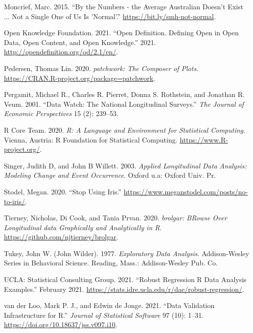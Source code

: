 \documentclass{article}
\newlength{\cslhangindent}
\newlength{\cslentryspacingunit} %
\newenvironment{CSLReferences}[2] %
 {%
  \setlength{\parindent}{0pt}
  \ifodd #1
  \let\oldpar\par
  \def\par{\hangindent=\cslhangindent\oldpar}
  \fi
  \setlength{\parskip}{#2\cslentryspacingunit}
 }%
 {}
\begin{document}
\begin{CSLReferences}{1}{0}
\leavevmode{}%
Moncrief, Marc. 2015. {``By the Numbers - the Average Australian Doesn't Exist ... Not a Single One of Us Is 'Normal'.''} \url{https://bit.ly/smh-not-normal}.

\leavevmode{}%
Open Knowledge Foundation. 2021. {``Open Definition. Defining Open in Open Data, Open Content, and Open Knowledge.''} 2021. \url{http://opendefinition.org/od/2.1/en/}.

\leavevmode{}%
Pedersen, Thomas Lin. 2020. \emph{{patchwork: The Composer of Plots}}. \url{https://CRAN.R-project.org/package=patchwork}.

\leavevmode{}%
Pergamit, Michael R., Charles R. Pierret, Donna S. Rothstein, and Jonathan R. Veum. 2001. {``Data Watch: The National Longitudinal Surveys.''} \emph{The Journal of Economic Perspectives} 15 (2): 239--53.

\leavevmode{}%
R Core Team. 2020. \emph{R: A Language and Environment for Statistical Computing}. Vienna, Austria: R Foundation for Statistical Computing. \url{https://www.R-project.org/}.

\leavevmode{}%
Singer, Judith D, and John B Willett. 2003. \emph{Applied Longitudinal Data Analysis: Modeling Change and Event Occurrence}. Oxford u.a: Oxford Univ. Pr.

\leavevmode{}%
Stodel, Megan. 2020. {``Stop Using Iris.''} \url{https://www.meganstodel.com/posts/no-to-iris/}.

\leavevmode{}%
Tierney, Nicholas, Di Cook, and Tania Prvan. 2020. \emph{{brolgar: BRowse Over Longitudinal data Graphically and Analytically in R}}. \url{https://github.com/njtierney/brolgar}.

\leavevmode{}%
Tukey, John W. (John Wilder). 1977. \emph{Exploratory Data Analysis}. Addison-Wesley Series in Behavioral Science. Reading, Mass.: Addison-Wesley Pub. Co.

\leavevmode{}%
UCLA: Statistical Consulting Group. 2021. {``{Robust Regression \textbar{} R Data Analysis Examples}.''} February 2021. \url{https://stats.idre.ucla.edu/r/dae/robust-regression/}.

\leavevmode{}%
van der Loo, Mark P. J., and Edwin de Jonge. 2021. {``Data Validation Infrastructure for {R}.''} \emph{Journal of Statistical Software} 97 (10): 1--31. \url{https://doi.org/10.18637/jss.v097.i10}.


\end{CSLReferences}
\end{document}
